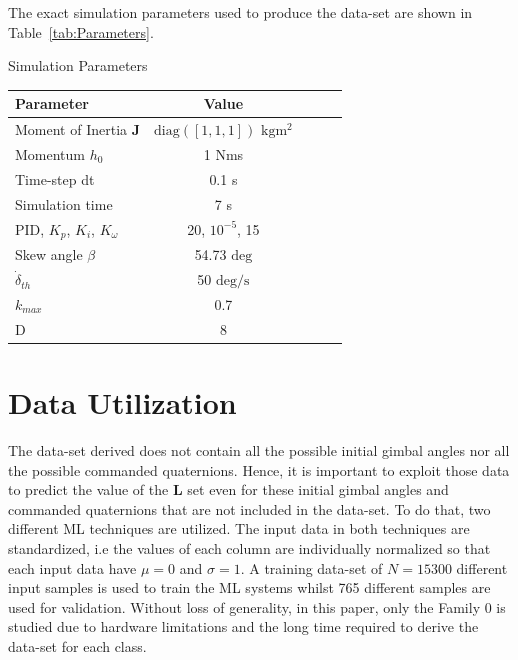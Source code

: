 \documentclass[aerospace,article,submit,moreauthors,dvi2pdf]{Definitions/mdpi}
\begin{document}
The exact simulation parameters used to produce the data-set are shown in Table~\ref{tab:Parameters}.

\begin{specialtable}[hbt!]
\caption{\label{tab:Parameters} Simulation Parameters}
\begin{tabular}{lcccc}
\toprule
\textbf{Parameter}&\textbf{Value}\\
\midrule
Moment of Inertia \textbf{J}& $\mathrm{diag}([1, 1, 1])$ $\mathrm{kgm^2}$\\
Momentum $h_0$ & 1 Nms  \\
Time-step dt&0.1 s\\
Simulation time& 7 s\\
PID, $K_p$, $K_i$, $K_\omega$ &20, $10^{-5}$, 15\\
Skew angle $\beta$ & 54.73 $ \mathrm{deg}$\\
$\dot{{\delta}}_{th}$ &50 $\mathrm{deg/s}$\\
$k_{max}$ & 0.7\\
D&8\\
\bottomrule
\end{tabular}
\end{specialtable}
 
 
 
 \section{Data Utilization}
The data-set derived does not contain all the possible initial gimbal angles nor all the possible commanded quaternions. Hence, it is important to exploit those data to predict the value of the $\textbf{L}$ set even for these initial gimbal angles and commanded quaternions that are not included in the data-set. To do that, two different ML techniques are utilized.
The input data in both techniques are standardized, i.e the values of each column are individually normalized so that each input data have $\mu=0$ and $\sigma=1$. A training data-set of $N=15300$ %
different input samples is used to train the ML systems whilst 765 different samples are used for validation. Without loss of generality, in this paper, only the Family 0 is studied due to hardware limitations and the long time required to derive the data-set for each class. 
\end{document}
